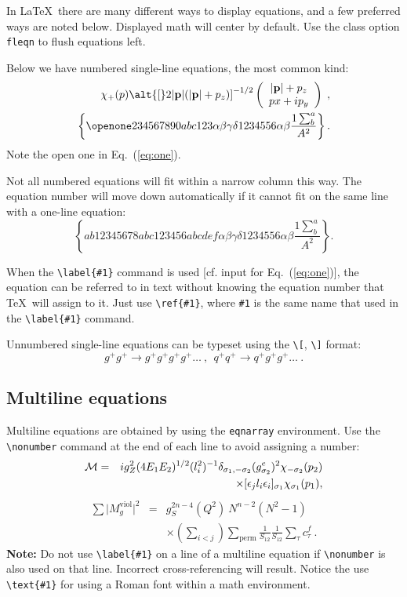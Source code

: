 \documentclass[%
 aip,
 amsmath,amssymb,
reprint, onecolumn %
]{revtex4-1}
\begin{document}
In \LaTeX\ there are many different ways to display equations, and a
few preferred ways are noted below. Displayed math will center by
default. Use the class option \verb+fleqn+ to flush equations left.

Below we have numbered single-line equations, the most common kind: 
\begin{eqnarray}
\chi_+(p)\alt{\bf [}2|{\bf p}|(|{\bf p}|+p_z){\bf ]}^{-1/2}
\left(
\begin{array}{c}
|{\bf p}|+p_z\\
px+ip_y
\end{array}\right)\;,
\\
\left\{%
 \openone234567890abc123\alpha\beta\gamma\delta1234556\alpha\beta
 \frac{1\sum^{a}_{b}}{A^2}%
\right\}%
\label{eq:one}.
\end{eqnarray}
Note the open one in Eq.~(\ref{eq:one}).

Not all numbered equations will fit within a narrow column this
way. The equation number will move down automatically if it cannot fit
on the same line with a one-line equation:
\begin{equation}
\left\{
 ab12345678abc123456abcdef\alpha\beta\gamma\delta1234556\alpha\beta
 \frac{1\sum^{a}_{b}}{A^2}%
\right\}.
\end{equation}

When the \verb+\label{#1}+ command is used [cf. input for
Eq.~(\ref{eq:one})], the equation can be referred to in text without
knowing the equation number that \TeX\ will assign to it. Just
use \verb+\ref{#1}+, where \verb+#1+ is the same name that used in
the \verb+\label{#1}+ command.

Unnumbered single-line equations can be typeset
using the \verb+\[+, \verb+\]+ format:
\[g^+g^+ \rightarrow g^+g^+g^+g^+ \dots ~,~~q^+q^+\rightarrow
q^+g^+g^+ \dots ~. \]

\subsection{Multiline equations}

Multiline equations are obtained by using the \verb+eqnarray+
environment.  Use the \verb+\nonumber+ command at the end of each line
to avoid assigning a number:
\begin{eqnarray}
{\cal M}=&&ig_Z^2(4E_1E_2)^{1/2}(l_i^2)^{-1}
\delta_{\sigma_1,-\sigma_2}
(g_{\sigma_2}^e)^2\chi_{-\sigma_2}(p_2)\nonumber\\
&&\times
[\epsilon_jl_i\epsilon_i]_{\sigma_1}\chi_{\sigma_1}(p_1),
\end{eqnarray}
\begin{eqnarray}
\sum \vert M^{\text{viol}}_g \vert ^2&=&g^{2n-4}_S(Q^2)~N^{n-2}
        (N^2-1)\nonumber \\
 & &\times \left( \sum_{i<j}\right)
  \sum_{\text{perm}}
 \frac{1}{S_{12}}
 \frac{1}{S_{12}}
 \sum_\tau c^f_\tau~.
\end{eqnarray}
\textbf{Note:} Do not use \verb+\label{#1}+ on a line of a multiline
equation if \verb+\nonumber+ is also used on that line. Incorrect
cross-referencing will result. Notice the use \verb+\text{#1}+ for
using a Roman font within a math environment.
\end{document}
